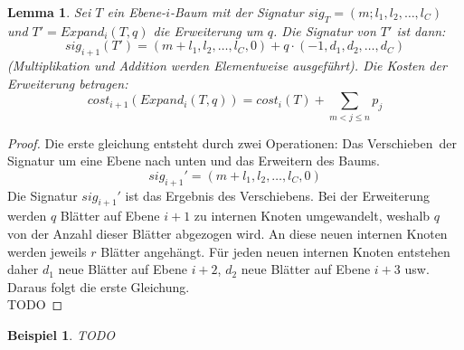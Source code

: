 \documentclass[a4paper,10pt,ngerman]{scrartcl}
\newtheorem{lemma}[satz]{Lemma}
\newtheorem{beispiel}[satz]{Beispiel}
\begin{document}
    \begin{lemma}
        Sei $T$ ein Ebene-$i$-Baum mit der Signatur $sig_T = (m;l_1,l_2,\dots,l_C)$ und $T' = Expand_i(T,q)$ die Erweiterung um $q$. Die Signatur von $T'$ ist dann: \[sig_{i+1}(T') = (m + l_1, l_2, \dots, l_C, 0) + q \cdot (-1, d_1, d_2, \dots, d_C)\]
        (Multiplikation und Addition werden Elementweise ausgeführt). Die Kosten der Erweiterung betragen:
        \[cost_{i+1}(Expand_i(T,q)) = cost_i(T) + \sum_{m < j \le n}p_j\]
    \end{lemma}
    \begin{proof}
        Die erste gleichung entsteht durch zwei Operationen: Das \glqq Verschieben\grqq\ der Signatur um eine Ebene nach unten und das Erweitern des Baums.
        \[sig_{i+1}' = (m + l_1, l_2, \dots, l_C, 0)\]
        Die Signatur $sig_{i+1}'$ ist das Ergebnis des Verschiebens.
        Bei der Erweiterung werden $q$ Blätter auf Ebene $i + 1$ zu internen Knoten umgewandelt, weshalb $q$ von der Anzahl dieser Blätter abgezogen wird.
        An diese neuen internen Knoten werden jeweils $r$ Blätter angehängt.
        Für jeden neuen internen Knoten entstehen daher $d_1$ neue Blätter auf Ebene $i+2$, $d_2$ neue Blätter auf Ebene $i+3$ usw.
        Daraus folgt die erste Gleichung. \\
        TODO

    \end{proof}
    \begin{beispiel}
        TODO
    \end{beispiel}
\end{document}
